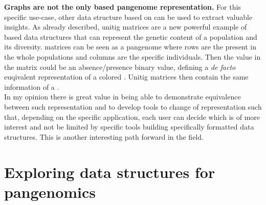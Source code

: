 \textbf{Graphs are not the only \kmer based pangenome representation.}
For this specific use-case, other data structure based on \kmers can be used to extract valuable insights. 
As already described, unitig matrices are a new powerful example of \kmer based data structures that can represent the genetic content of a population and its diversity. 
\kmer matrices \cite{kmtricks} can be seen as a pangenome where rows are the \kmers present in the whole populations and columns are the specific individuals. Then the value in the matrix could be an absence/presence binary value, defining a \emph{de facto} euqivalent representation of a colored \dbg. Unitig matrices then contain the same information of a \ccdbg. \\
In my opinion there is great value in being able to demonstrate equivalence between such representation and to develop tools to change of representation such that, depending on the specific application, each user can decide which is of more interest and not be limited by specific tools building specifically formatted data structures. This is another interesting path forward in the field.

\section{Exploring \kmer data structures for pangenomics}